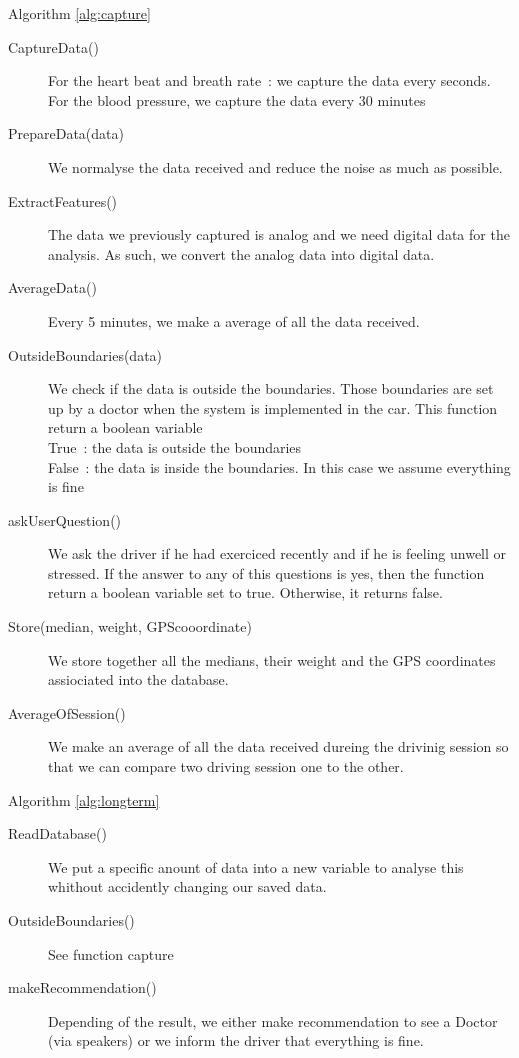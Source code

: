 Algorithm \ref{alg:capture}
\begin{description}
	\item [CaptureData()] For the heart beat and breath rate : we capture the data every seconds. For the blood pressure, we capture the data every 30 minutes
	\item [PrepareData(data)] We normalyse the data received and reduce the noise as much as possible.

	\item [ExtractFeatures()] The data we previously captured is analog and we need digital data for the analysis. As such, we convert the analog data into digital data.
	\item [AverageData()] Every 5 minutes, we make a average of all the data received.
	\item [OutsideBoundaries(data)] We check if the data is outside the boundaries. Those boundaries are set up by a doctor when the system is implemented in the car. This function return a boolean variable\\
	True : the data is outside the boundaries\\
	False : the data is inside the boundaries. In this case we assume everything is fine
	\item [askUserQuestion()] We ask the driver if he had exerciced recently and if he is feeling unwell or stressed. If the answer to any of this questions is yes, then the function return a boolean variable set to true. Otherwise, it returns false.
\item [Store(median, weight, GPScooordinate)] We store together all the medians, their weight and the GPS coordinates assiociated into the database.
\item [AverageOfSession()] We make an average of all the data received dureing the drivinig session so that we can compare two driving session one to the other.
\end{description}
Algorithm \ref{alg:longterm}
\begin{description}
	\item [ReadDatabase()] We put a specific anount of data into a new variable to analyse this whithout accidently changing our saved data.
	\item [OutsideBoundaries()] See function capture
	\item [makeRecommendation()] Depending of the result, we either make recommendation to see a Doctor (via speakers) or we inform the driver that everything is fine.
\end{description}


